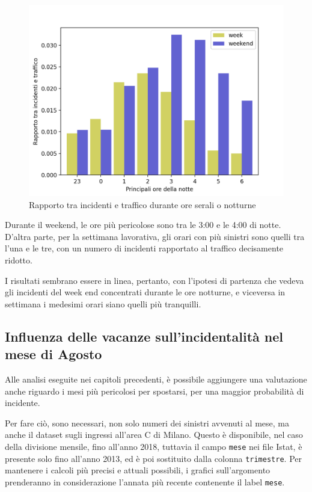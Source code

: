 \documentclass[a4paper,12pt]{report}
\newcommand{\columnstyle}[1]{\texttt{#1}}
\begin{document}
\begin{figure}
    \includegraphics[width=\linewidth]{../src/area_c/rapporto_inc_notte.png}
    \caption{Rapporto tra incidenti e traffico durante ore serali o notturne}
    \label{fig:rapp-inc-traff}
\end{figure}

Durante il weekend, le ore più pericolose sono tra le 3:00 e le 4:00 di notte. 
D'altra parte, per la settimana lavorativa, gli orari con più sinistri sono quelli 
tra l'una e le tre, con un numero di incidenti rapportato al 
traffico decisamente ridotto. 

I risultati sembrano essere 
in linea, pertanto, con l'ipotesi di partenza che vedeva gli incidenti del week 
end concentrati durante le ore notturne, e viceversa in settimana i medesimi orari 
siano quelli più tranquilli.

\subsection{Influenza delle vacanze sull'incidentalità nel mese di Agosto}

Alle analisi eseguite nei capitoli precedenti, 
è possibile aggiungere una valutazione anche riguardo i mesi più pericolosi per spostarsi, 
per una maggior probabilità di incidente.

Per fare ciò, sono necessari, non solo numeri dei sinistri avvenuti al mese, 
ma anche il dataset sugli ingressi all'area C di Milano. 
Questo è disponibile, nel caso della divisione 
mensile, fino all'anno 2018, tuttavia il campo \columnstyle{mese} nei file Istat, è 
presente solo fino all'anno 2013, ed è poi sostituito 
dalla colonna \columnstyle{trimestre}. 
Per mantenere i calcoli più precisi e attuali possibili, i grafici sull'argomento prenderanno 
in considerazione l'annata più recente contenente il label \columnstyle{mese}. 
\end{document}
